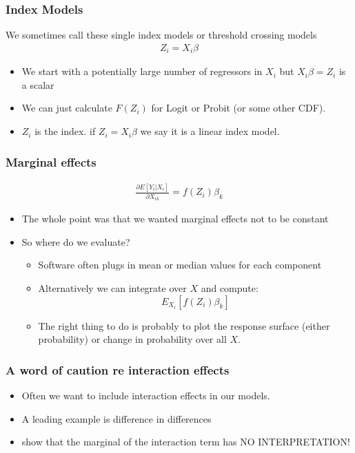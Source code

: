        
\begin{frame}
       \frametitle{Index Models}
       We sometimes call these single index models or threshold crossing models
       \begin{eqnarray*}
       Z_i = X_i \beta
       \end{eqnarray*}
       \begin{itemize}
       \item We start with a potentially large number of regressors in $X_i$ but $X_i \beta = Z_i$ is a \alert{scalar}
       \item We can just calculate $F(Z_i)$ for Logit or Probit (or some other CDF).
       \item $Z_i$ is the \alert{index}. if $Z_i = X_i \beta$ we say it is a \alert{linear index} model.
       \end{itemize}
\end{frame}

\begin{frame}
       \frametitle{Marginal effects}
       \begin{eqnarray*}
       \frac{\partial E[Y_i | X_i] }{\partial X_{ik}} = f (Z_i) \beta_k
       \end{eqnarray*}
       \begin{itemize}
       \item The whole point was that we wanted marginal effects not to be constant
       \item So where do we evaluate?
       \begin{itemize}
       \item Software often plugs in mean or median values for each component
       \item Alternatively we can integrate over $X$ and compute:
       $$
       E_{X_i}[ f (Z_i) \beta_k]
       $$
       \item The right thing to do is probably to plot the response surface (either probability) or change in probability over all $X$.
       \end{itemize}
       \end{itemize}
\end{frame}

\begin{frame}
       \frametitle{A word of caution re interaction effects}
       \begin{itemize}
       \item Often we want to include interaction effects in our models. 
       \item A leading example is difference in differences 
       \item \citet{ai2003interaction} show that the marginal of the interaction term has NO INTERPRETATION!
       \end{itemize}
\end{frame}

